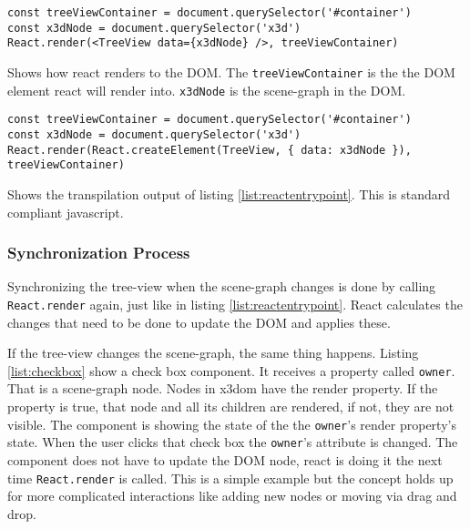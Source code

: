 \begin{listing}
  \begin{verbatim}
const treeViewContainer = document.querySelector('#container')
const x3dNode = document.querySelector('x3d')
React.render(<TreeView data={x3dNode} />, treeViewContainer)
  \end{verbatim}
  \caption{Shows how react renders to the \gls{DOM}. The \texttt{treeViewContainer} is the the \gls{DOM} element react will render into. \texttt{x3dNode} is the scene-graph in the \gls{DOM}.}
  \label{list:reactentrypoint}
\end{listing}

\begin{listing}
  \begin{verbatim}
const treeViewContainer = document.querySelector('#container')
const x3dNode = document.querySelector('x3d')
React.render(React.createElement(TreeView, { data: x3dNode }), treeViewContainer)
  \end{verbatim}
  \caption{Shows the transpilation output of listing \ref{list:reactentrypoint}. This is standard compliant javascript.}
  \label{list:reacttranspiled}
\end{listing}

\subsubsection{Synchronization Process}
\label{synchronization-process}

Synchronizing the tree-view when the scene-graph changes is done by calling
\texttt{React.render} again, just like in listing \ref{list:reactentrypoint}. React
calculates the changes that need to be done to update the \gls{DOM} and applies these.

If the tree-view changes the scene-graph, the same thing happens. Listing
\ref{list:checkbox} show a check box component. It receives a property called
\texttt{owner}. That is a scene-graph node. Nodes in x3dom have the render
property. If the property is true, that node and all its children are rendered,
if not, they are not visible. The component is showing the state of the the
\texttt{owner}'s render property's state. When the user clicks that check box the
\texttt{owner}'s attribute is changed. The component does not have to update the
\gls{DOM} node, react is doing it the next time \texttt{React.render} is called. This
is a simple example but the concept holds up for more complicated interactions
like adding new nodes or moving via drag and drop.

